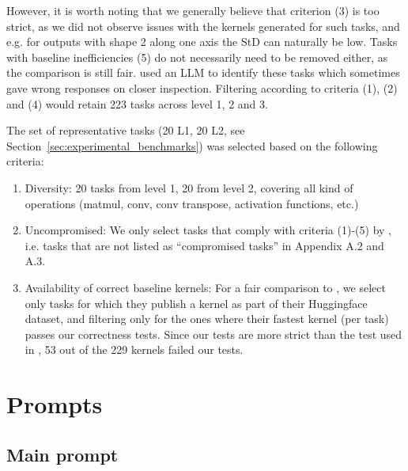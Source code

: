 However, it is worth noting that we generally believe that criterion (3) is too strict, as we did not observe issues with the kernels generated for such tasks, and e.g. for outputs with shape 2 along one axis the StD can naturally be low. Tasks with baseline inefficiencies (5) do not necessarily need to be removed either, as the comparison is still fair. \citet{lange2025towards} used an LLM to identify these tasks which sometimes gave wrong responses on closer inspection. Filtering according to criteria (1), (2) and (4) would retain 223 tasks across level 1, 2 and 3.

The set of representative tasks (20 L1, 20 L2, see Section~\ref{sec:experimental_benchmarks}) was selected based on the following criteria:
\begin{enumerate}\itemsep-0.3em
    \item Diversity: 20 tasks from level 1, 20 from level 2, covering all kind of operations (matmul, conv, conv transpose, activation functions, etc.)
    \item Uncompromised: We only select tasks that comply with criteria (1)-(5)  by \citet{lange2025towards}, i.e. tasks that are not listed as ``compromised tasks'' in \cite{lange2025towards} Appendix A.2 and A.3.
    \item Availability of correct baseline kernels: For a fair comparison to \cite{lange2025ai}, we select only tasks for which they publish a kernel as part of their Huggingface dataset, and filtering only for the ones where their fastest kernel (per task) passes our correctness tests. Since our tests are more strict than the test used in \cite{lange2025ai}, 53 out of the 229 kernels failed our tests.
\end{enumerate}

\section{Prompts}\label{app:prompts}

\subsection{Main prompt}

